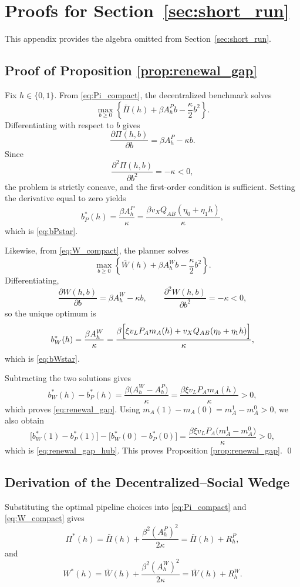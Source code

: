 \section{Proofs for Section~\ref{sec:short_run}}

This appendix provides the algebra omitted from Section~\ref{sec:short_run}.

\subsection{Proof of Proposition \ref{prop:renewal_gap}}

Fix $h\in\{0,1\}$. From \eqref{eq:Pi_compact}, the decentralized benchmark solves
\[
\max_{b\ge 0}\left\{\bar\Pi(h)+\beta A_h^P b-\frac{\kappa}{2}b^2\right\}.
\]
Differentiating with respect to $b$ gives
\[
\frac{\partial \Pi(h,b)}{\partial b}=\beta A_h^P-\kappa b.
\]
Since
\[
\frac{\partial^2 \Pi(h,b)}{\partial b^2}=-\kappa<0,
\]
the problem is strictly concave, and the first-order condition is sufficient. Setting the derivative equal to zero yields
\[
b_P^*(h)=\frac{\beta A_h^P}{\kappa}
=
\frac{\beta v_XQ_{AB}(\eta_0+\eta_1 h)}{\kappa},
\]
which is \eqref{eq:bPstar}.

Likewise, from \eqref{eq:W_compact}, the planner solves
\[
\max_{b\ge 0}\left\{\bar W(h)+\beta A_h^W b-\frac{\kappa}{2}b^2\right\}.
\]
Differentiating,
\[
\frac{\partial W(h,b)}{\partial b}=\beta A_h^W-\kappa b,
\qquad
\frac{\partial^2 W(h,b)}{\partial b^2}=-\kappa<0,
\]
so the unique optimum is
\[
b_W^*(h)=\frac{\beta A_h^W}{\kappa}
=
\frac{\beta\Bigl[\xi v_LP_A m_A(h)+v_XQ_{AB}(\eta_0+\eta_1 h)\Bigr]}{\kappa},
\]
which is \eqref{eq:bWstar}.

Subtracting the two solutions gives
\[
b_W^*(h)-b_P^*(h)
=
\frac{\beta\bigl(A_h^W-A_h^P\bigr)}{\kappa}
=
\frac{\beta\xi v_LP_A m_A(h)}{\kappa}
>0,
\]
which proves \eqref{eq:renewal_gap}. Using $m_A(1)-m_A(0)=m_A^1-m_A^0>0$, we also obtain
\[
\bigl[b_W^*(1)-b_P^*(1)\bigr]-\bigl[b_W^*(0)-b_P^*(0)\bigr]
=
\frac{\beta\xi v_LP_A\bigl(m_A^1-m_A^0\bigr)}{\kappa}
>0,
\]
which is \eqref{eq:renewal_gap_hub}. This proves Proposition \ref{prop:renewal_gap}.
\qed

\subsection{Derivation of the Decentralized--Social Wedge}

Substituting the optimal pipeline choices into \eqref{eq:Pi_compact} and \eqref{eq:W_compact} gives
\[
\Pi^*(h)=\bar\Pi(h)+\frac{\beta^2(A_h^P)^2}{2\kappa}
=
\bar\Pi(h)+R_h^P,
\]
and
\[
W^*(h)=\bar W(h)+\frac{\beta^2(A_h^W)^2}{2\kappa}
=
\bar W(h)+R_h^W.
\]

